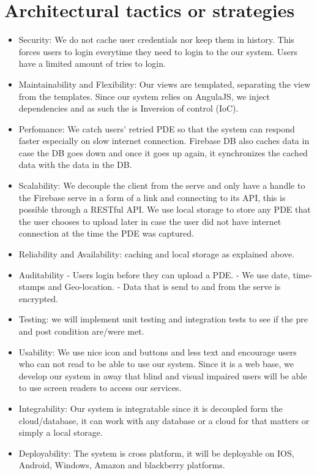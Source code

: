 \documentclass[a4paper,12pt]{article}
\begin{document}
\section{Architectural tactics or strategies}
\begin{itemize}
\item Security: We do not cache user credentials nor keep them in history. This forces users to login everytime they need to login to the our system.  Users have a limited amount of tries to login. 
\item Maintainability and Flexibility: Our views are templated, separating the view from the templates. Since our system relies on AngulaJS, we inject dependencies and as such the is Inversion of control (IoC).
\item Perfomance: We catch users' retried PDE so that the system can respond faster especially on slow internet connection. Firebase DB also caches data in case the DB goes down and once it goes up again, it synchronizes the cached data with the data in the DB.
\item Scalability: We decouple the client from the serve and only have a handle to the Firebase serve in a form of a link and connecting to its API, this is possible through a RESTful API.
We use local storage to store any PDE that the user chooses to upload later in case the user did not have internet connection at the time the PDE was captured.
\item Reliability and Availability: caching and local storage as explained above.
\item Auditability - Users login before they can upload a PDE.
	- We use date, time-stamps and Geo-location.
	- Data that is send to and from the serve is encrypted.
\item Testing: we will implement unit testing and integration tests to see if the pre and post condition are/were met.
\item Usability: We use nice icon and buttons and less text and encourage users who can not read to be able to use our system. Since it is a web base, we develop our system in away that blind and visual impaired users will be able to use screen readers to access our services.
\item Integrability: Our system is integratable since it is decoupled form the cloud/database, it can work with any database or a cloud for that matters or simply a local storage. 
\item Deployability: The system is cross platform, it will be deployable on IOS, Android, Windows, Amazon and blackberry platforms.	
\end{itemize}
\end{document}
